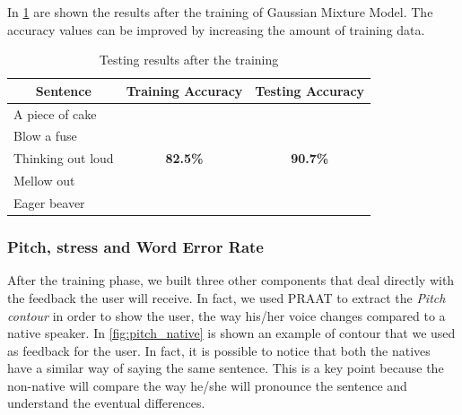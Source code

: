 \noindent In \ref{table:accuracy} are shown the results after the training of Gaussian Mixture Model. The accuracy values can be improved by increasing the amount of training data.

\begin{table}[!ht]
	\centering
	\caption{Testing results after the training}
	\label{table:accuracy}
	\begin{tabular}{|l|c|c|}
		\hline
		\multicolumn{1}{|c|}{\textbf{Sentence}} & \textbf{Training Accuracy}       & \textbf{Testing Accuracy}        \\ \hline
		A piece of cake                         & 								   &
		\\ \cline{1-1}
		Blow a fuse                             &                                  &                                  \\ \cline{1-1}
		Thinking out loud                       &  \textbf{82.5\%}                 & \textbf{90.7\%}
		\\ \cline{1-1}
		Mellow out                              &                                  &                                  \\ \cline{1-1}
		Eager beaver                            &                                  &                                  \\ \hline
	\end{tabular}
\end{table}

\subsubsection{Pitch, stress and Word Error Rate}
\noindent After the training phase, we built three other components that deal directly with the feedback the user will receive. In fact, we used PRAAT to extract the \textit{Pitch contour} in order to show the user, the way his/her voice changes compared to a native speaker. In \ref{fig:pitch_native} is shown an example of contour that we used as feedback for the user. In fact, it is possible to notice that both the natives have a similar way of saying the same sentence. This is a key point because the non-native will compare the way he/she will pronounce the sentence and understand the eventual differences. \\

